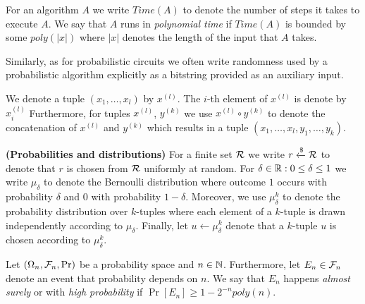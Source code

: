 
For an algorithm $A$ we write $\mathit{Time}(A)$ to denote the number of steps it takes to execute $A$.
We say that $A$ runs in \textit{polynomial time} if $\mathit{Time}(A)$ is bounded by some $poly(|x|)$ where $|x|$ denotes the length of the input that $A$ takes.

Similarly, as for probabilistic circuits we often write randomness used by a probabilistic algorithm explicitly
as a bitstring provided as an auxiliary input.

We denote a tuple $(x_1, \dotsc, x_l)$ by $x^{(l)}$.
The $i$-th element of $x^{(l)}$ is denote by $x^{(l)}_i$
Furthermore, for tuples $x^{(l)}$, $y^{(k)}$ we use $x^{(l)} \circ y^{(k)}$ to denote the concatenation of $x^{(l)}$ and $y^{(k)}$ which results in
a tuple $(x_1, \dotsc, x_l, y_1, \dotsc, y_k)$.

\textbf{(Probabilities and distributions)}
For a finite set $\mathcal{R}$ we write $r \xleftarrow{\$} \mathcal{R}$ to denote that $r$ is chosen from $\mathcal{R}$ uniformly at random.
For $\delta \in \mathbb{R} : 0 \leq \delta \leq 1$ we write $\mu_{\delta}$ to denote the Bernoulli distribution where outcome $1$ occurs with
probability $\delta$ and $0$ with probability $1-\delta$.
Moreover, we use $\mu_{\delta}^k$ to denote the probability distribution over $k$-tuples
where each element of a $k$-tuple is drawn independently according to $\mu_{\delta}$.
Finally, let $u \leftarrow \mu_{\delta}^k$ denote that a $k$-tuple $u$ is chosen according to $\mu_{\delta}^k$.

Let $(\Omega_n, \mathcal{F}_n, \Pr)$ be a probability space and $n \in \mathbb{N}$.
Furthermore, let $E_n \in \mathcal{F}_n$ denote an event that probability depends on $n$.
We say that $E_n$ happens \textit{almost surely} or with \textit{high probability} if $\Pr[E_n] \geq 1 - 2^{-n} \mathit{poly}(n)$.


